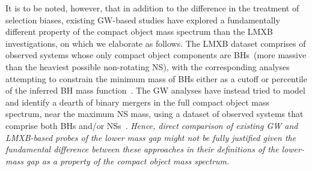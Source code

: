 \documentclass[modern]{aastex631}
\begin{document}


It is to be noted, however, that in addition to the difference in the treatment of selection biases, existing GW-based studies have explored a fundamentally different property of the compact object mass spectrum than the LMXB investigations, on which we elaborate as follows. The LMXB dataset comprises of observed systems whose only compact object components are BHs~(more massive than the heaviest possible non-rotating NS), with the corresponding analyses attempting to constrain the minimum mass of BHs either as a cutoff or percentile of the inferred BH mass function~\citep{Bailyn:1997xt, Ozel:2010su, Farr:2010tu}. The GW analyses have instead tried to model and identify a dearth of binary mergers in the full compact object mass spectrum, near the maximum NS mass, using a dataset of observed systems that comprise both BHs and/or NSs~\citep[i.e. including BNS systems,][]{Farah:2021qom, KAGRA:2021duu, LIGOScientific:2024elc}. \textit{Hence, direct comparison of existing GW and LMXB-based probes of the lower mass gap might not be fully justified given the fundamental difference between these approaches in their definitions of the lower-mass gap as a property of the compact object mass spectrum.} %
\end{document}
